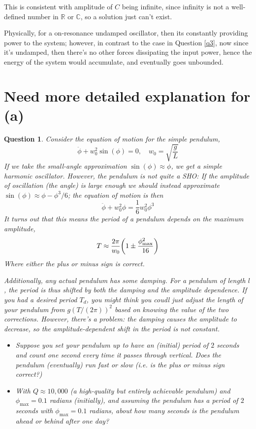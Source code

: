 \documentclass{article}
\newtheorem{question}{Question}
\newcommand{\RR}{\mathbb{R}}
\newcommand{\CC}{\mathbb{C}}
\DeclarePairedDelimiter{\paran}{(}{)}%
\begin{document}
\hfil

This is consistent with amplitude of $C$ being infinite, since infinity is not a well-defined number in $\RR$ or $\CC$, so a solution just can't exist.

Physically, for a on-resonance undamped oscillator, then its constantly providing power to the system; however, in contrast to the case in Question \ref{q3}, now since it's undamped, then there's no other forces dissipating the input power, hence the energy of the system would accumulate, and eventually goes unbounded.

\break

\section{Need more detailed explanation for (a)}
\begin{question}\label{q6}
    Consider the equation of motion for the simple pendulum,
    $$\ddot \phi+w_0^2\sin(\phi)=0,\quad w_0=\sqrt{\frac{g}{L}}$$
    If we take the small-angle approximation $\sin(\phi)\approx\phi$, we get a simple harmonic oscillator. However, the pendulum is not quite a SHO: If the amplitude of oscillation (the angle) is large enough we should instead approximate $\sin(\phi)\approx \phi-\phi^3/6$; the equation of motion is then 
    $$\ddot\phi+w_0^2\phi=\frac{1}{6}w_0^2\phi^3$$
    It turns out that this means the period of a pendulum depends on the maximum amplitude,
    $$T\approx\frac{2\pi}{w_0}\paran*{1\pm\frac{\phi^2_{\max}}{16}}$$
    Where either the plus or minus sign is correct.
    
    Additionally, any actual pendulum has some damping. For a pendulum of length $l$, the period is thus shifted by both the damping and the amplitude dependence. If you had a desired period $T_d$, you might think you coudl just adjust the length of your pendulum from $g(T/(2\pi))^2$ based on knowing the value of the two corrections. However, there's a problem: the damping causes the amplitude to decrease, so the amplitude-dependent shift in the period is not constant.
    \begin{itemize}
        \item[(a)] Suppose you set your pendulum up to have an (initial) period of $2$ seconds and count one second every time it passes through vertical. Does the pendulum (eventually) run fast or slow (i.e. is the plus or minus sign correct?) 
        \item[(b)] With $Q\approx 10,000$ (a high-quality but entirely achievable pendulum) and $\phi_{\max}=0.1$ radians (initially), and assuming the pendulum has a period of $2$ seconds with $\phi_{\max}=0.1$ radians, about how many seconds is the pendulum ahead or behind after one day? 
    \end{itemize}
\end{question}
\end{document}
